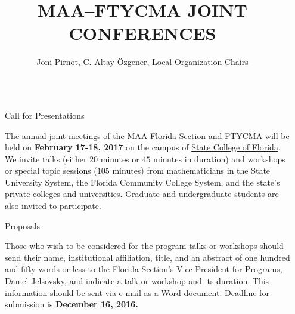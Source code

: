 \documentclass[final,hyperref={pdfpagelabels=false},12pt]{beamer}
\title{\HUGE  MAA--FTYCMA JOINT CONFERENCES} %
\author{Joni Pirnot, C. Altay \"Ozgener, Local Organization Chairs}
\institute{State College of Florida, Manatee--Sarasota, Bradenton, FL}
\begin{document}

\begin{frame}[t] %

\begin{columns}[t] %

\begin{column}{.02\textwidth}\end{column} %

\begin{column}{.465\textwidth} %


\begin{block}{Call for Presentations}

The annual joint meetings of the MAA-Florida Section and FTYCMA will be held on {\bf {February 17-18, 2017}} on the campus of \href{http://www.scf.edu/}{State College of Florida}.  We invite talks (either $20$ minutes or $45$ minutes in duration) and workshops or special topic sessions ($105$ minutes) from mathematicians in the State University System, the Florida Community College System, and the state's private colleges and universities. Graduate and undergraduate students are also invited to participate. 




\end{block}

            
\begin{block}{Proposals}

Those who wish to be considered for the program talks or workshops should send their name, institutional affiliation, title, and an abstract of one hundred and fifty words or less to the Florida Section's Vice-President for Programs, 
\href{mailto:djelsovsky@flsouthern.edu?subject=FL-MAA Call for Papers 2017}{Daniel Jelsovsky}, and indicate a talk or workshop and its duration.  This information should be sent via e-mail as a Word document.  Deadline for submission is \bf{December 16, 2016}.



\end{block}
\end{column}
\end{columns}
\end{frame}
\end{document}
